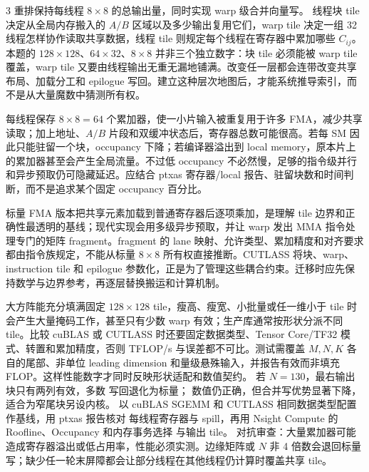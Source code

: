 \begin{solutionexercise}{3}
\conclusionheading 重排保持每线程 $8\times8$ 的总输出量，同时实现 warp 级合并向量写。
\discussionheading
{}线程块 tile 决定从全局内存搬入的 $A/B$ 区域以及多少输出复用它们，warp tile 决定一组 32 线程怎样协作读取共享数据，线程 tile 则规定每个线程在寄存器中累加哪些 $C_{ij}$。本题的 $128\times128$、$64\times32$、$8\times8$ 并非三个独立数字：块 tile 必须能被 warp tile 覆盖，warp tile 又要由线程输出无重无漏地铺满。改变任一层都会连带改变共享布局、加载分工和 epilogue 写回。建立这种层次地图后，才能系统推导索引，而不是从大量魔数中猜测所有权。

每线程保存 $8\times8=64$ 个累加器，使一小片输入被重复用于许多 FMA，减少共享读取；加上地址、$A/B$ 片段和双缓冲状态后，寄存器总数可能很高。若每 SM 因此只能驻留一个块，occupancy 下降；若编译器溢出到 local memory，原本片上的累加器甚至会产生全局流量。不过低 occupancy 不必然慢，足够的指令级并行和异步预取仍可隐藏延迟。应结合 ptxas 寄存器/local 报告、驻留块数和时间判断，而不是追求某个固定 occupancy 百分比。

标量 FMA 版本把共享元素加载到普通寄存器后逐项乘加，是理解 tile 边界和正确性最透明的基线；现代实现会用多级异步预取，并让 warp 发出 MMA 指令处理专门的矩阵 fragment。fragment 的 lane 映射、允许类型、累加精度和对齐要求都由指令族规定，不能从标量 $8\times8$ 所有权直接推断。CUTLASS 将块、warp、instruction tile 和 epilogue 参数化，正是为了管理这些耦合约束。迁移时应先保持数学与边界参考，再逐层替换搬运和计算机制。

大方阵能充分填满固定 $128\times128$ tile，瘦高、瘦宽、小批量或任一维小于 tile 时会产生大量掩码工作，甚至只有少数 warp 有效；生产库通常按形状分派不同 tile。比较 cuBLAS 或 CUTLASS 时还要固定数据类型、Tensor Core/TF32 模式、转置和累加精度，否则 TFLOP/s 与误差都不可比。测试需覆盖 $M,N,K$ 各自的尾部、非单位 leading dimension 和量级悬殊输入，并报告有效而非填充 FLOP。这样性能数字才同时反映形状适配和数值契约。
\variantheading 若 $N=130$，最右输出块只有两列有效，多数  写回退化为标量；
数值仍正确，但合并写优势显著下降，适合为窄尾块另设内核。
\practiceheading 以 cuBLAS SGEMM 和 CUTLASS 相同数据类型配置作基线，用 ptxas 报告核对
每线程寄存器与 spill，再用 Nsight Compute 的 Roofline、Occupancy 和内存事务选择
 与输出 tile。
对抗审查：大量累加器可能造成寄存器溢出或低占用率，性能必须实测。边缘矩阵或 $N$ 非
4 倍数会退回标量写；缺少任一轮末屏障都会让部分线程在其他线程仍计算时覆盖共享 tile。
\end{solutionexercise}
